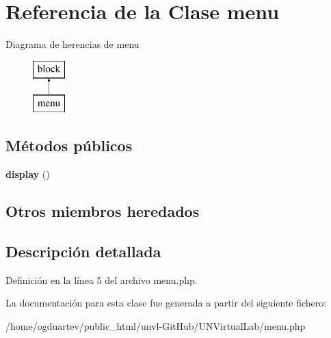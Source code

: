 \hypertarget{classmenu}{}\section{Referencia de la Clase menu}
\label{classmenu}
Diagrama de herencias de menu\begin{figure}[H]
\begin{center}
\leavevmode
\includegraphics[height=2.000000cm]{classmenu}
\end{center}
\end{figure}
\subsection*{Métodos públicos}
\begin{DoxyCompactItemize}
\item 
\mbox{\label{classmenu_abadf0a36d865e21da5799e2b9268edfa}} 
{\bfseries display} ()
\end{DoxyCompactItemize}
\subsection*{Otros miembros heredados}


\subsection{Descripción detallada}


Definición en la línea 5 del archivo menu.\+php.



La documentación para esta clase fue generada a partir del siguiente fichero\+:\begin{DoxyCompactItemize}
\item 
/home/ogduartev/public\+\_\+html/unvl-\/\+Git\+Hub/\+U\+N\+Virtual\+Lab/menu.\+php\end{DoxyCompactItemize}
